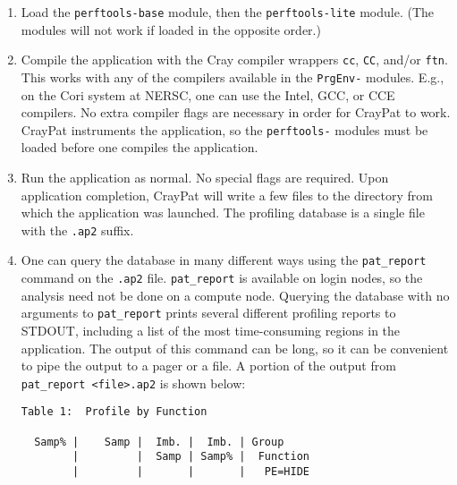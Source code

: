 \begin{enumerate}
    \item Load the \texttt{perftools-base} module, then the
        \texttt{perftools-lite} module. (The modules will not work if loaded in
        the opposite order.)
    \item Compile the application with the Cray compiler wrappers \texttt{cc},
        \texttt{CC}, and/or \texttt{ftn}. This works with any of the compilers
        available in the \texttt{PrgEnv-} modules. E.g., on the Cori system at
        NERSC, one can use the Intel, GCC, or CCE compilers. No extra compiler
        flags are necessary in order for CrayPat to work. CrayPat instruments
        the application, so the \texttt{perftools-} modules must be loaded
        before one compiles the application.
    \item Run the application as normal. No special flags are required. Upon
        application completion, CrayPat will write a few files to the directory
        from which the application was launched. The profiling database is a
        single file with the \texttt{.ap2} suffix.
    \item One can query the database in many different ways using the
        \texttt{pat\_report} command on the \texttt{.ap2} file. \texttt{pat\_report} is
        available on login nodes, so the analysis need not be done on a compute node.
        Querying the database with no arguments to \texttt{pat\_report} prints several
        different profiling reports to STDOUT, including a list of the most
        time-consuming regions in the application. The output of this command can be
        long, so it can be convenient to pipe the output to a pager or a file. A
        portion of the output from \texttt{pat\_report <file>.ap2} is shown below:

\begin{verbatim}
Table 1:  Profile by Function

  Samp% |    Samp |  Imb. |  Imb. | Group
        |         |  Samp | Samp% |  Function
        |         |       |       |   PE=HIDE


\end{verbatim}
\end{enumerate}
